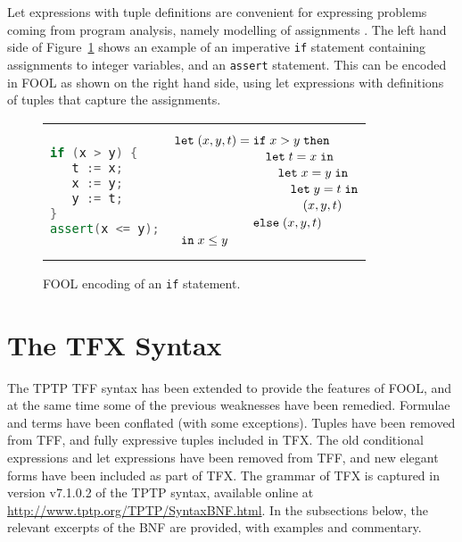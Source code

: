 Let expressions with tuple definitions are convenient for expressing 
problems coming from program analysis, namely modelling of assignments
\cite{KKV18}.
The left hand side of Figure~\ref{fig:tfx/simple-if} shows an example of an 
imperative \texttt{if} statement containing assignments to integer variables, 
and an \texttt{assert} statement. 
This can be encoded in FOOL as shown on the right hand side, using 
let expressions with definitions of tuples that capture the assignments.

\begin{figure}[htbp]
\begin{center}
\begin{tabular}[t]{ll}
\begin{minipage}{0.26\textwidth}
\vspace{0.8cm}
\begin{lstlisting}[language=cpp]
if (x > y) {
   t := x;
   x := y;
   y := t;
}
assert(x <= y);
\end{lstlisting}
\end{minipage}
&\hspace{0.4cm}
\begin{minipage}{0.5\textwidth}
\[
  \letnl{(x,y,t)}{\itenll{x > y}
                 {\letinnl{t}{x}
                          {\letinnl{x}{y}
                                   {\letinnl{y}{t}
                                            {(x,y,t)}}}}
                 {(x,y,t)}}
        {x \le y}
\]
\end{minipage}
\\
\end{tabular}
\end{center}
\caption{FOOL encoding of an {\tt if} statement.}
\label{fig:tfx/simple-if}
\end{figure}

\section{The TFX Syntax}
\label{sec:tfx/TFX}

The TPTP TFF syntax has been extended to provide the features of FOOL,
and at the same time some of the previous weaknesses have been remedied.
Formulae and terms have been conflated (with some exceptions).
Tuples have been removed from TFF, and fully expressive tuples included in 
TFX. 
The old conditional expressions and let expressions have been removed from 
TFF, and new elegant forms have been included as part of TFX. 
The grammar of TFX is captured in version v7.1.0.2 of the TPTP syntax,
available online at \url{http://www.tptp.org/TPTP/SyntaxBNF.html}.
In the subsections below, the relevant excerpts of the BNF are provided,
with examples and commentary.

